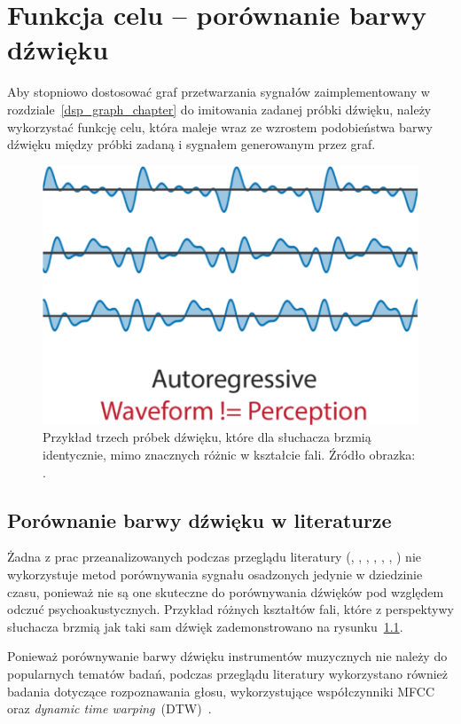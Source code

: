 \chapter{Funkcja celu -- porównanie barwy dźwięku} \label{target_function_chapter}

Aby stopniowo dostosować graf przetwarzania sygnałów zaimplementowany 
w rozdziale~\ref{dsp_graph_chapter} do imitowania zadanej próbki dźwięku,
należy wykorzystać funkcję celu, która maleje wraz ze wzrostem podobieństwa
barwy dźwięku między próbki zadaną i sygnałem generowanym przez graf. 

\begin{figure}[H]
    \centering
    \includegraphics[width=0.5\linewidth]{rys03/d_dsp_example_graph.png}
    \caption{
      Przykład trzech próbek dźwięku, które dla słuchacza brzmią identycznie, mimo
      znacznych różnic w kształcie fali. Źródło obrazka: \cite{engel2020ddsp}.
    }
    \label{fig:waveform_not_equal_to_perception}
\end{figure}

\section{Porównanie barwy dźwięku w literaturze} \label{sec:timbre_comparison_literature_overview}

Żadna z prac przeanalizowanych podczas przeglądu literatury
(\cite{engel2020ddsp}, \cite{ieee_synth_programming}, \cite{ddx7}, \cite{riffusion},
\cite{evolutionary_puredata}, \cite{parallel_evolutionary_optimization_synth_parameters}, \cite{mfcc_dtw})
nie wykorzystuje metod porównywania sygnału osadzonych jedynie w dziedzinie czasu, ponieważ
nie są one skuteczne do porównywania dźwięków pod względem odczuć psychoakustycznych.
Przykład różnych kształtów fali, które z perspektywy słuchacza brzmią jak
taki sam dźwięk zademonstrowano na rysunku~\ref{fig:waveform_not_equal_to_perception}.

Ponieważ porównywanie barwy dźwięku instrumentów muzycznych nie należy do popularnych
tematów badań, podczas przeglądu literatury wykorzystano również badania dotyczące
rozpoznawania głosu, wykorzystujące współczynniki MFCC oraz
\textit{dynamic time warping}~(DTW)~\cite{mfcc_dtw}.

